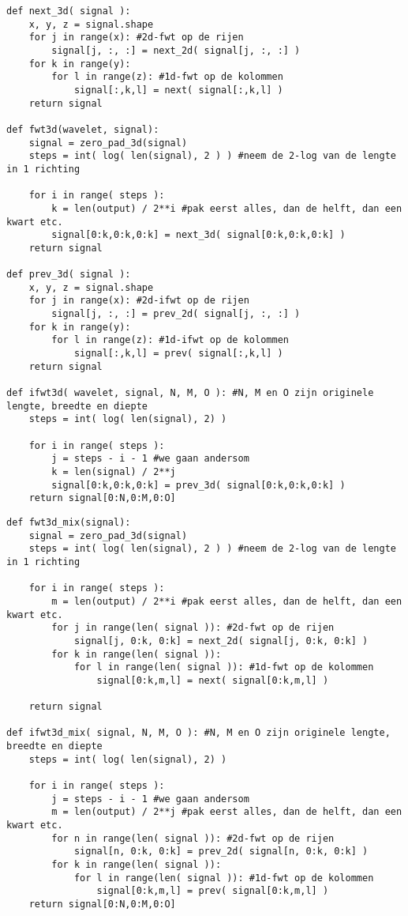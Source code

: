 \begin{lstlisting}[label=mallat3d,float=h!,caption=De Mallatdecompositie in 3 dimensies]
def next_3d( signal ):
	x, y, z = signal.shape
	for j in range(x): #2d-fwt op de rijen
		signal[j, :, :] = next_2d( signal[j, :, :] )
	for k in range(y):
		for l in range(z): #1d-fwt op de kolommen
			signal[:,k,l] = next( signal[:,k,l] )
	return signal

def fwt3d(wavelet, signal):
	signal = zero_pad_3d(signal)
	steps = int( log( len(signal), 2 ) ) #neem de 2-log van de lengte in 1 richting
	
	for i in range( steps ):
		k = len(output) / 2**i #pak eerst alles, dan de helft, dan een kwart etc.
		signal[0:k,0:k,0:k] = next_3d( signal[0:k,0:k,0:k] )
	return signal

def prev_3d( signal ):
	x, y, z = signal.shape
	for j in range(x): #2d-ifwt op de rijen
		signal[j, :, :] = prev_2d( signal[j, :, :] )
	for k in range(y):
		for l in range(z): #1d-ifwt op de kolommen
			signal[:,k,l] = prev( signal[:,k,l] )
	return signal

def ifwt3d( wavelet, signal, N, M, O ): #N, M en O zijn originele lengte, breedte en diepte
	steps = int( log( len(signal), 2) )
	
	for i in range( steps ):
		j = steps - i - 1 #we gaan andersom
		k = len(signal) / 2**j
		signal[0:k,0:k,0:k] = prev_3d( signal[0:k,0:k,0:k] )
	return signal[0:N,0:M,0:O]
\end{lstlisting}

\begin{lstlisting}[label=mengertje,float=h!,caption=De mengvorm in 3 dimensies]
def fwt3d_mix(signal):
	signal = zero_pad_3d(signal)
	steps = int( log( len(signal), 2 ) ) #neem de 2-log van de lengte in 1 richting
	
	for i in range( steps ):
		m = len(output) / 2**i #pak eerst alles, dan de helft, dan een kwart etc.
		for j in range(len( signal )): #2d-fwt op de rijen
			signal[j, 0:k, 0:k] = next_2d( signal[j, 0:k, 0:k] )
		for k in range(len( signal )):
			for l in range(len( signal )): #1d-fwt op de kolommen
				signal[0:k,m,l] = next( signal[0:k,m,l] )

	return signal

def ifwt3d_mix( signal, N, M, O ): #N, M en O zijn originele lengte, breedte en diepte
	steps = int( log( len(signal), 2) )
	
	for i in range( steps ):
		j = steps - i - 1 #we gaan andersom
		m = len(output) / 2**j #pak eerst alles, dan de helft, dan een kwart etc.
		for n in range(len( signal )): #2d-fwt op de rijen
			signal[n, 0:k, 0:k] = prev_2d( signal[n, 0:k, 0:k] )
		for k in range(len( signal )):
			for l in range(len( signal )): #1d-fwt op de kolommen
				signal[0:k,m,l] = prev( signal[0:k,m,l] )
	return signal[0:N,0:M,0:O]
\end{lstlisting}
